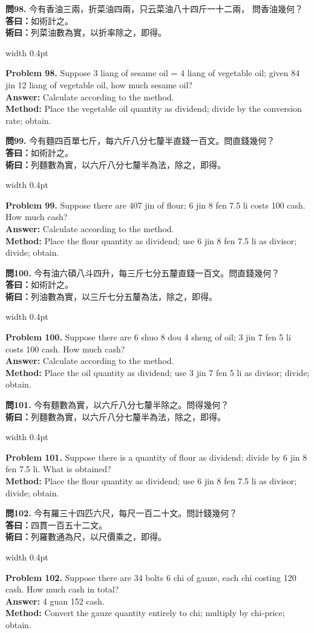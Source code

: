 \documentclass[10pt,a4paper]{article}
\newlength{\cnwidth}
\newlength{\enwidth}
\newcommand{\bilingual}[2]{%
  \noindent%
  \begin{minipage}[t]{\cnwidth}%
    #1%
  \end{minipage}%
  \hfill\vrule width 0.4pt\hfill%
  \begin{minipage}[t]{\enwidth}%
    #2%
  \end{minipage}%
  \par\smallskip%
}
\begin{document}
\bilingual{%
  \textbf{問98.}
  今有香油三兩，折菜油四兩，只云菜油八十四斤一十二兩，
  問香油幾何？\\
  \textbf{答曰：}如術計之。\\
  \textbf{術曰：}列菜油數為實，以折率除之，即得。
}{%
  \textbf{Problem 98.}
  Suppose 3 liang of sesame oil = 4 liang of vegetable oil;
  given 84 jin 12 liang of vegetable oil, how much sesame oil?\\
  \textbf{Answer:} Calculate according to the method.\\
  \textbf{Method:} Place the vegetable oil quantity as dividend; divide by the
  conversion rate; obtain.
}

\bilingual{%
  \textbf{問99.}
  今有麵四百單七斤，每六斤八分七釐半直錢一百文。問直錢幾何？\\
  \textbf{答曰：}如術計之。\\
  \textbf{術曰：}列麵數為實，以六斤八分七釐半為法，除之，即得。
}{%
  \textbf{Problem 99.}
  Suppose there are 407 jin of flour; 6 jin 8 fen 7.5 li costs 100 cash.
  How much cash?\\
  \textbf{Answer:} Calculate according to the method.\\
  \textbf{Method:} Place the flour quantity as dividend; use 6 jin 8 fen 7.5 li
  as divisor; divide; obtain.
}

\bilingual{%
  \textbf{問100.}
  今有油六碩八斗四升，每三斤七分五釐直錢一百文。問直錢幾何？\\
  \textbf{答曰：}如術計之。\\
  \textbf{術曰：}列油數為實，以三斤七分五釐為法，除之，即得。
}{%
  \textbf{Problem 100.}
  Suppose there are 6 shuo 8 dou 4 sheng of oil; 3 jin 7 fen 5 li costs 100 cash.
  How much cash?\\
  \textbf{Answer:} Calculate according to the method.\\
  \textbf{Method:} Place the oil quantity as dividend; use 3 jin 7 fen 5 li as
  divisor; divide; obtain.
}

\bilingual{%
  \textbf{問101.}
  今有麵數為實，以六斤八分七釐半除之。問得幾何？\\
  \textbf{術曰：}列麵數為實，以六斤八分七釐半為法，除之，即得。
}{%
  \textbf{Problem 101.}
  Suppose there is a quantity of flour as dividend; divide by 6 jin 8 fen 7.5 li.
  What is obtained?\\
  \textbf{Method:} Place the flour quantity as dividend; use 6 jin 8 fen 7.5 li as
  divisor; divide; obtain.
}

\bilingual{%
  \textbf{問102.}
  今有羅三十四匹六尺，每尺一百二十文。問計錢幾何？\\
  \textbf{答曰：}四貫一百五十二文。\\
  \textbf{術曰：}列羅數通為尺，以尺價乘之，即得。
}{%
  \textbf{Problem 102.}
  Suppose there are 34 bolts 6 chi of gauze, each chi costing 120 cash.
  How much cash in total?\\
  \textbf{Answer:} 4 guan 152 cash.\\
  \textbf{Method:} Convert the gauze quantity entirely to chi; multiply by chi-price;
  obtain.
}
\end{document}
